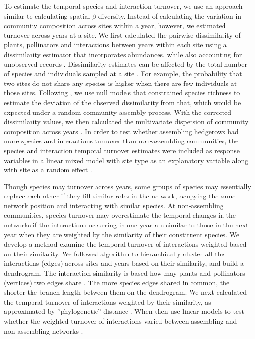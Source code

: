 \documentclass[12pt]{article}
\begin{document}
To estimate the temporal species and interaction turnover, we use an
approach similar to calculating spatial $\beta$-diversity. Instead of
calculating the variation in community composition across sites within
a year, however, we estimated turnover across years at a site. We
first calculated the pairwise dissimilarity of plants, pollinators and
interactions between years within each site using a dissimilarity
estimator that incorporates abundances, while also accounting for
unobserved records \citep{chao-2005-148}. Dissimilarity estimates can
be affected by the total number of species and individuals sampled at
a site \citep[e.g.,][]{ponisio2015farm}. For example, the probability
that two sites do not share any species is higher when there are few
individuals at those sites. Following \cite{ponisio2015farm}, we use
null models that constrained species richness to estimate the
deviation of the observed dissimilarity from that, which would be
expected under a random community assembly process. With the corrected
dissimilarity values, we then calculated the multivariate dispersion
of community composition across years \citep{anderson-2011-19}. In
order to test whether assembling hedgerows had more species and
interactions turnover than non-assembling communities, the species and
interaction temporal turnover estimates were included as response
variables in a linear mixed model with site type as an explanatory
variable along with site as a random effect \citep{lme4, lmetest}.

Though species may turnover across years, some groups of species may
essentially replace each other if they fill similar roles in the
network, ocupying the same network position and interacting with
similar species. At non-assembling communities, species turnover may
overestimate the temporal changes in the networks if the interactions
occurring in one year are similar to those in the next year when they
are weighted by the similarity of their constituent species. We
develop a method examine the temporal turnover of interactions
weighted based on their similarity. We followed \cite{ahn2010link}
algorithm to hierarchically cluster all the interactions (edges)
across sites and years based on their similarity, and build a
dendrogram. The interaction similarity is based how may plants and
pollinators (vertices) two edges share \citep{ahn2010link,
  kalinka2011linkcomm}. The more species edges shared in common, the
shorter the branch length between them on the dendrogram.  We next
calculated the temporal turnover of interactions weighted by their
similarity, as approximated by ``phylogenetic'' distance
\citep{graham2008phylogenetic, picante-2010-1463}. When then use
linear models to test whether the weighted turnover of interactions
varied between assembling and non-assembling networks \citep{lme4,
  lmetest}.
\end{document}
